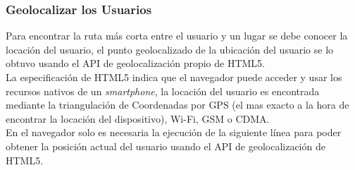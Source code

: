 %
%
%



\subsubsection{Geolocalizar los Usuarios}
\label{sub:Manejo de Usuarios}

Para encontrar la ruta más corta entre el usuario y un lugar se debe conocer la locación del usuario, el punto geolocalizado de la ubicación del usuario se lo obtuvo usando el API de geolocalización propio de HTML5. \\

La especificación de HTML5 indica que el navegador puede acceder y usar los recursos nativos de un \emph{smartphone}, la locación del usuario es encontrada mediante la triangulación de Coordenadas por GPS (el mas exacto a la hora de encontrar la locación del dispositivo), Wi-Fi, GSM o CDMA. \\

En el navegador solo es necesaria la ejecución de la siguiente línea para poder obtener la posición actual del usuario usando el API de geolocalización de HTML5.


